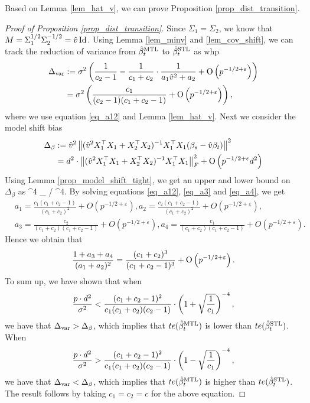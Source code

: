 Based on Lemma \ref{lem_hat_v}, we can prove Proposition \ref{prop_dist_transition}.
\begin{proof}[Proof of Proposition \ref{prop_dist_transition}]
	Since $\Sigma_1 = \Sigma_2$, we know that $M = \Sigma_1^{1/2}\Sigma_2^{-1/2} = \hat{v} \operatorname{Id}$.
	Using Lemma \ref{lem_minv} and \ref{lem_cov_shift}, we can track the reduction of variance from $\hat{\beta}_t^{\text{MTL}}$ to $\hat{\beta}_t^{\text{STL}}$ as whp
	\begin{align}
		\Delta_{\text{var}} &:= \sigma^2 \left({\frac{1}{c_2 - 1} - \frac{1}{c_1 + c_2}\cdot\frac{1}{a_1\hat{v}^2 + a_2} + \operatorname{O}\left(p^{-1/2+\varepsilon}\right)}\right) \nonumber\\
		&= \sigma^2 \left({\frac{c_1}{(c_2-1)(c_1 + c_2 -1)} + \operatorname{O}\left(p^{-1/2 + \varepsilon}\right)}\right),\label{Deltavar}
	\end{align}
	where we use equation \eqref{eq_a12} and Lemma \ref{lem_hat_v}.
	Next we consider the model shift bias
	\begin{align*}
		\Delta_{\beta} &:= \hat{v}^2 \left\| (\hat{v}^2 X_1^{\top}X_1 + X_2^{\top}X_2)^{-1} X_1^{\top}X_1 (\beta_s - \hat{v}\beta_t) \right\|^2 \\
		&= d^2 \cdot \left\| (\hat{v}^2 X_1^{\top}X_1 + X_2^{\top}X_2)^{-1}X_1^{\top}X_1 \right\|_{F}^2 + \operatorname{O}\left(p^{-1/2 + \varepsilon}d^2\right)
	\end{align*}
	Using Lemma \ref{prop_model_shift_tight}, we get an upper and lower bound on $\Delta_{\beta}$ as
	\be\label{Deltabeta} ^4 \le \Delta_{\beta} /  \le {}^4. \ee
	By solving equations \eqref{eq_a12}, \eqref{eq_a3} and \eqref{eq_a4}, we get
	\begin{align*}
		& a_1 = \frac{c_1(c_1 + c_2 - 1)}{(c_1 + c_2)^2} + O(p^{-1/2 + \varepsilon}),
		a_2 = \frac{c_2(c_1 + c_2 - 1)}{(c_1 + c_2)^2} + O(p^{-1/2 + \varepsilon}), \\
		& a_3 = \frac{c_2}{(c_1 + c_2)(c_1 + c_2 - 1)} + O(p^{-1/2 + \varepsilon}),
		a_4 = \frac{c_1}{(c_1 + c_2)(c_1 + c_2 - 1)} + O(p^{-1/2 + \varepsilon}).
	\end{align*}
	Hence we obtain that
	\begin{align*}
		\frac{1 + a_3 + a_4}{(a_1 + a_2)^2}
		= \frac{(c_1 + c_2)^3}{(c_1 + c_2 - 1)^3} + \operatorname{O}\left(p^{-1/2+\varepsilon}\right).
	\end{align*}
	To sum up, we have shown that when
	\[ \frac{p\cdot d^2}{\sigma^2} < \frac{(c_1 + c_2 - 1)^2}{c_1(c_1 + c_2) (c_2 - 1)} \cdot \left({1 + \sqrt{\frac 1 {c_1}}}\right)^{-4}, \]
	we have that $\Delta_{\text{var}} > \Delta_{\beta}$, which implies that $te(\hat{\beta}_t^{\text{MTL}})$ is lower than $te(\hat{\beta}_t^{\text{STL}})$.
	When
	\[ \frac{p\cdot d^2}{\sigma^2} > \frac{(c_1 + c_2 - 1)^2}{c_1 (c_1 + c_2) (c_2 - 1)} \cdot \left({1 - \sqrt{\frac 1 {c_1}}}\right)^{-4}, \]
	we have that $\Delta_{\text{var}} < \Delta_{\beta}$, which implies that $te(\hat{\beta}_t^{\text{MTL}})$ is higher than $te(\hat{\beta}_t^{\text{STL}})$.
	The result follows by taking $c_1 = c_2 = c$ for the above equation.
\end{proof}

